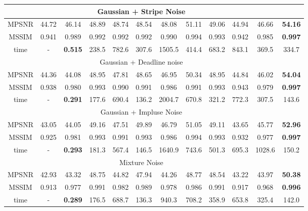 \documentclass[journal]{IEEEtran}
\begin{document}
\begin{table*}
\begin{center}
{{\begin{tabular}{c c c c c c c c c c c c}
						\hline
						\multicolumn{11}{c}{Gaussian + Stripe Noise}\\ \hline
						MPSNR &44.72  & 46.14   & 48.89 & 48.74 & 48.54 & 48.08 & 51.11  & 49.06 & 44.94   & 46.66 & {\bf{54.16}}\\
						MSSIM & 0.941   & 0.989 & 0.992 & 0.992 & 0.992  &  0.990 & 0.994 &  0.993 & 0.942   & 0.985 & {\bf{ 0.997}} \\
						time & 	- & \bf{0.515}	& 238.5 & 782.6	& 307.6 & 1505.5	& 414.4	& 683.2 & 843.1 & 369.5  & 334.7 \\	
						\hline
						\multicolumn{11}{c}{Gaussian + Deadline noise}\\ \hline
						MPSNR & 44.36  & 44.08    & 48.95 & 47.81 & 48.65 & 46.95  &  50.34  & 48.95 & 44.84 & 46.02 & {\bf{54.04}}\\
						MSSIM & 0.938  & 0.980    & 0.993 & 0.990    & 0.991 & 0.986  &  0.991 & 0.993 & 0.943 & 0.979 & {\bf{0.997}} \\
						time & 	- & \bf{0.291 } &177.6   &690.4	& 136.2	& 2004.7 	&670.8  	& 321.2  &  772.3	&307.5    &143.6   \\					\hline
						\multicolumn{11}{c}{Gaussian + Impluse Noise}\\ \hline
						MPSNR & 43.05 & 44.05  & 49.16 & 47.51 & 49.89 & 46.79  & 51.05  & 49.11 & 43.65 & 45.77 & {\bf{ 52.96}}\\
						MSSIM & 0.925   & 0.981 & 0.993 & 0.991 &0.993  & 0.986 & 0.994  &0.993  & 0.932  & 0.977 & {\bf{0.997}} \\
						time & 	- & \bf{0.293} 	&181.3 &567.4	& 146.5& 1640.9	& 743.6	&501.3 & 695.3	& 1028.6  & 150.2 \\					
						\hline
						\multicolumn{11}{c}{Mixture Noise}\\ \hline
						MPSNR & 42.93 & 43.32 & 48.75   & 44.82 & 47.94   & 44.26 & 48.77  & 48.54 & 43.22 & 43.97   & {\bf{50.38}}\\
						MSSIM & 0.913  &0.977  & 0.991& 0.982 & 0.989 & 0.978  & 0.986 & 0.991 & 0.917   & 0.968 & {\bf{0.996}} \\
						time & 	- & \bf{0.289} 	& 176.5 &688.7& 136.3 	& 940.3	& 708.2 & 358.9	& 653.8  & 325.4&142.0\\				
						\hline									
					\end{tabular} }
				}
			\end{center}
			
		\end{table*}
		
\end{document}
